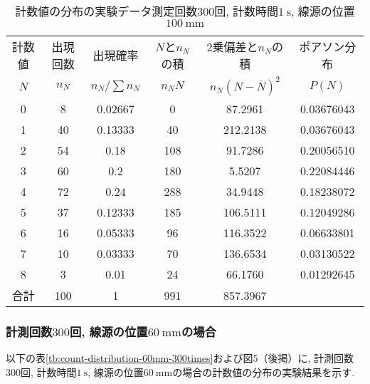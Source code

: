 \documentclass{jarticle}
\begin{document}
\begin{table}[H]
  \caption{計数値の分布の実験データ\protect\linebreak 測定回数$300$回, 計数時間$1\ \mathrm{s}$, 線源の位置$100\ \mathrm{mm}$}
  \label{tb:count-distribution-100mm-300times}
  \hspace{-1cm}
  \begin{tabular}{cccccc}
    \hline
    計数値 & 出現回数 & 出現確率 & $N$と$n_N$の積 & 2乗偏差と$n_N$の積 & ポアソン分布 \\
    $N$ & $n_N$ & $n_N/\sum n_N$ & $n_N N$ & $n_N(N-\overline{N})^2$ & $P(N)$ \\
    \hline
    0 & 8 & 0.02667 & 0 & 87.2961 & 0.03676043 \\
    1 & 40 & 0.13333 & 40 & 212.2138 & 0.03676043 \\
    2 & 54 & 0.18 & 108 & 91.7286 & 0.20056510 \\
    3 & 60 & 0.2 & 180 & 5.5207 & 0.22084446 \\
    4 & 72 & 0.24 & 288 & 34.9448 & 0.18238072 \\
    5 & 37 & 0.12333 & 185 & 106.5111 & 0.12049286 \\
    6 & 16 & 0.05333 & 96 & 116.3522 & 0.06633801 \\
    7 & 10 & 0.03333 & 70 & 136.6534 & 0.03130522 \\
    8 & 3 & 0.01 & 24 & 66.1760 & 0.01292645 \\
    \hline
    合計 & 100 & 1 & 991 & 857.3967 & \\
    \hline
  \end{tabular}
\end{table}



\subsubsection{計測回数$300$回, 線源の位置$60\ \mathrm{mm}$の場合}

以下の表\ref{tb:count-distribution-60mm-300times}および図5（後掲）に, 計測回数$300$回, 計数時間$1\ \mathrm{s}$, 線源の位置$60\ \mathrm{mm}$の場合の計数値の分布の実験結果を示す.
\end{document}
